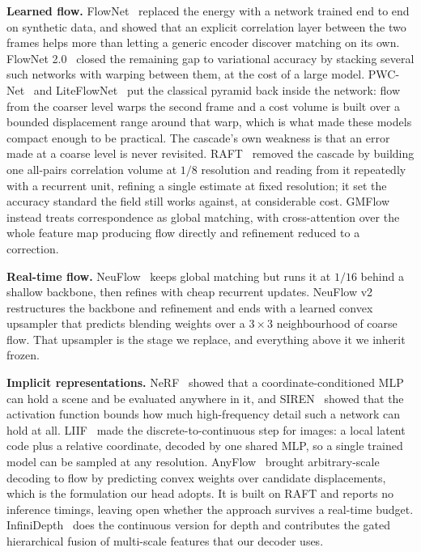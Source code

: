 \documentclass[conference]{IEEEtran}
\begin{document}
\textbf{Learned flow.} FlowNet~\cite{flownet} replaced the energy with a network
trained end to end on synthetic data, and showed that an explicit correlation
layer between the two frames helps more than letting a generic encoder discover
matching on its own. FlowNet 2.0~\cite{flownet2} closed the remaining gap to
variational accuracy by stacking several such networks with warping between them,
at the cost of a large model. PWC-Net~\cite{pwcnet} and
LiteFlowNet~\cite{liteflownet} put the classical pyramid back inside the network:
flow from the coarser level warps the second frame and a cost volume is built
over a bounded displacement range around that warp, which is what made these
models compact enough to be practical. The cascade's own weakness is that an
error made at a coarse level is never revisited. RAFT~\cite{raft} removed the
cascade by building one all-pairs correlation volume at $1/8$ resolution and
reading from it repeatedly with a recurrent unit, refining a single estimate at
fixed resolution; it set the accuracy standard the field still works against, at
considerable cost. GMFlow~\cite{gmflow} instead treats correspondence as global
matching, with cross-attention over the whole feature map producing flow directly
and refinement reduced to a correction.

\textbf{Real-time flow.} NeuFlow~\cite{neuflow1} keeps global matching but runs it
at $1/16$ behind a shallow backbone, then refines with cheap recurrent updates.
NeuFlow v2~\cite{neuflow2} restructures the backbone and refinement and ends with
a learned convex upsampler that predicts blending weights over a $3{\times}3$
neighbourhood of coarse flow. That upsampler is the stage we replace, and
everything above it we inherit frozen.

\textbf{Implicit representations.} NeRF~\cite{nerf} showed that a
coordinate-conditioned MLP can hold a scene and be evaluated anywhere in it, and
SIREN~\cite{siren} showed that the activation function bounds how much
high-frequency detail such a network can hold at all. LIIF~\cite{liif} made the
discrete-to-continuous step for images: a local latent code plus a relative
coordinate, decoded by one shared MLP, so a single trained model can be sampled
at any resolution. AnyFlow~\cite{anyflow} brought arbitrary-scale decoding to
flow by predicting convex weights over candidate displacements, which is the
formulation our head adopts. It is built on RAFT and reports no inference
timings, leaving open whether the approach survives a real-time budget.
InfiniDepth~\cite{infinidepth} does the continuous version for depth and
contributes the gated hierarchical fusion of multi-scale features that our
decoder uses.
\end{document}

